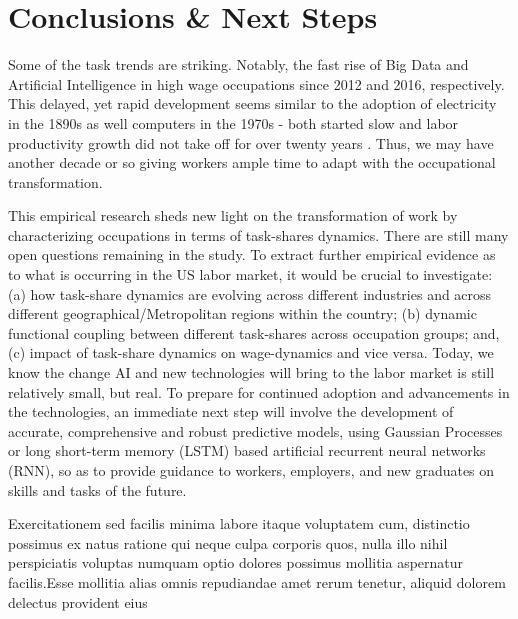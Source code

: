 \documentclass[letterpaper]{article} %
\begin{document}
\section{Conclusions \& Next Steps}
Some of the task trends are striking. Notably, the fast rise of Big Data and Artificial Intelligence in high wage occupations since 2012 and 2016, respectively. This delayed, yet rapid development seems similar to the adoption of electricity in the 1890s as well computers in the 1970s - both started slow and labor productivity growth did not take off for over twenty years \cite{BrynjolfssonMcAfee2014}. Thus, we may have another decade or so giving workers ample time to adapt with the occupational transformation.


\par
This empirical research sheds new light on the transformation of work by characterizing occupations in terms of task-shares dynamics. There are still many open questions remaining in the study. To extract further empirical evidence as to what is occurring in the US labor market, it would be crucial to investigate: (a) how task-share dynamics are evolving across different industries and across different geographical/Metropolitan regions within the country; (b) dynamic functional coupling between different task-shares across occupation groups; and, (c) impact of task-share dynamics on wage-dynamics and vice versa. Today, we know the change AI and new technologies will bring to the labor market is still relatively small, but real. To prepare for continued adoption and advancements in the technologies, an immediate next step will involve the development of accurate, comprehensive and robust predictive models, using Gaussian Processes or long short-term memory (LSTM) based artificial recurrent neural networks (RNN), so as to provide guidance to workers, employers, and new graduates on skills and tasks of the future.



Exercitationem sed facilis minima labore itaque voluptatem cum, distinctio possimus ex natus ratione qui neque culpa corporis quos, nulla illo nihil perspiciatis voluptas numquam optio dolores possimus mollitia aspernatur facilis.Esse mollitia alias omnis repudiandae amet rerum tenetur, aliquid dolorem delectus provident eius

\end{document}
